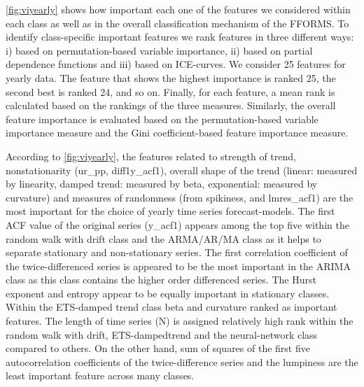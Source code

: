 \documentclass[11pt,a4paper,]{article}
\begin{document}
\autoref{fig:viyearly} shows how important each one of the features we
considered within each class as well as in the overall classification
mechanism of the FFORMS. To identify class-specific important features
we rank features in three different ways: i) based on permutation-based
variable importance, ii) based on partial dependence functions and iii)
based on ICE-curves. We consider 25 features for yearly data. The
feature that shows the highest importance is ranked 25, the second best
is ranked 24, and so on. Finally, for each feature, a mean rank is
calculated based on the rankings of the three measures. Similarly, the
overall feature importance is evaluated based on the permutation-based
variable importance measure and the Gini coefficient-based feature
importance measure.

According to \autoref{fig:viyearly}, the features related to strength of
trend, nonstationarity (ur\_pp, diff1y\_acf1), overall shape of the
trend (linear: measured by linearity, damped trend: measured by beta,
exponential: measured by curvature) and measures of randomness (from
spikiness, and lmres\_acf1) are the most important for the choice of
yearly time series forecast-models. The first ACF value of the original
series (y\_acf1) appears among the top five within the random walk with
drift class and the ARMA/AR/MA class as it helps to separate stationary
and non-stationary series. The first correlation coefficient of the
twice-differenced series is appeared to be the most important in the
ARIMA class as this class contains the higher order differenced series.
The Hurst exponent and entropy appear to be equally important in
stationary classes. Within the ETS-damped trend class beta and curvature
ranked as important features. The length of time series (N) is assigned
relatively high rank within the random walk with drift, ETS-dampedtrend
and the neural-network class compared to others. On the other hand, sum
of squares of the first five autocorrelation coefficients of the
twice-difference series and the lumpiness are the least important
feature across many classes.
\end{document}
